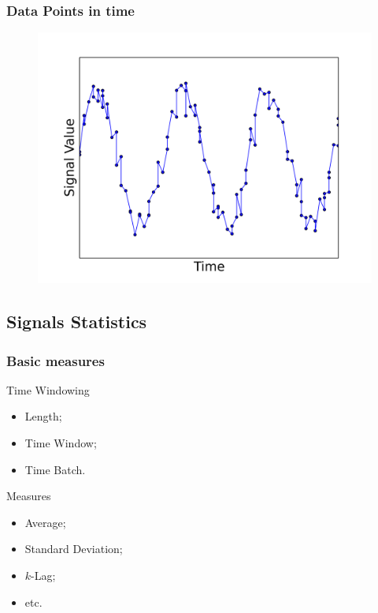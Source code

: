 \documentclass{beamer}
\begin{document}
  \begin{frame}[foot]
    \frametitle{Data Points in time}
    \begin{figure}
      \includegraphics[scale=.5]{./gfx/feature5.png}
    \end{figure}
  \end{frame}

  \subsection{Signals Statistics}
  \begin{frame}[foot]
    \frametitle{Basic measures}
    \begin{block}{Time Windowing}
      \begin{itemize}
        \item Length;
        \item Time Window;
        \item Time Batch.
      \end{itemize}
    \end{block}
    \begin{block}{Measures}
      \begin{itemize}
        \item Average;
        \item Standard Deviation;
        \item $k$-Lag;
        \item etc.\
      \end{itemize}
    \end{block}
  \end{frame}
\end{document}
